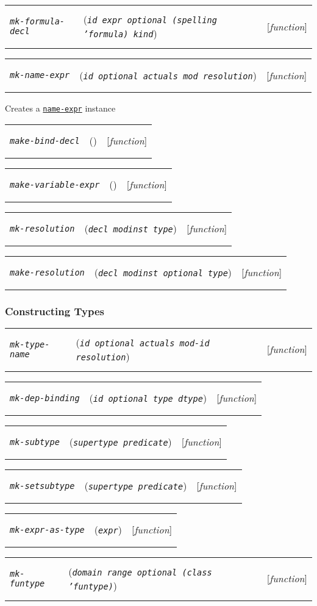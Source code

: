 \documentclass[12pt]{book}
\makeatletter
\def\ampoptional{{\smaller\sc {\smaller\smaller \&}optional\ }}
\newenvironment{function}[3]%
{\par\noindent\begin{boxedminipage}{\textwidth}%
 \par\noindent\begin{tabularx}{\linewidth}{l>{\raggedright}Xr}%
 \functionhtgt{#1}&(\texttt{\textit{#2}})&[\emph{#3}]%
 \end{tabularx}\par\flushright\begin{minipage}{.97\textwidth}}
{\end{minipage}\end{boxedminipage}}
\newcommand{\functionnm}[1]{\texttt{\textit{#1}}}
\newcommand{\functionhtgt}[1]{\hypertarget{#1}{\functionnm{#1}}\index{#1@\functionnm{#1}|underline}}
\newenvironment{lispfunction}[2]%
{\begin{function}{#1}{#2}{function}}{\end{function}}
\newcommand{\classnm}[1]{\texttt{\textup{#1}}}
\newcommand{\classhln}[1]{\hyperlink{#1}{\classnm{#1}}}
\makeatother
\begin{document}
\begin{lispfunction}{mk-formula-decl}
{id expr \ampoptional (spelling \texttt{'formula}) kind}
\end{lispfunction}

\begin{lispfunction}{mk-name-expr}{id \ampoptional actuals mod resolution}
Creates a \classhln{name-expr} instance
\end{lispfunction}

\begin{lispfunction}{make-bind-decl}{}
\end{lispfunction}

\begin{lispfunction}{make-variable-expr}{}
\end{lispfunction}

\begin{lispfunction}{mk-resolution}{decl modinst type}
\end{lispfunction}

\begin{lispfunction}{make-resolution}{decl modinst \ampoptional type}
\end{lispfunction}


\subsubsection{Constructing Types}

\begin{lispfunction}{mk-type-name}{id \ampoptional actuals mod-id resolution}
\end{lispfunction}

\begin{lispfunction}{mk-dep-binding}{id \ampoptional type dtype}
\end{lispfunction}

\begin{lispfunction}{mk-subtype}{supertype predicate}
\end{lispfunction}

\begin{lispfunction}{mk-setsubtype}{supertype predicate}
\end{lispfunction}

\begin{lispfunction}{mk-expr-as-type}{expr}
\end{lispfunction}

\begin{lispfunction}{mk-funtype}{domain range \ampoptional \textup{(}class \textup{'funtype}\textup{)}}
\end{lispfunction}
  
\end{document}
